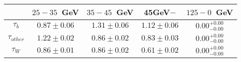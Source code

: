 \centering
\begin{tabular}{|c|c|c|c|c|} \hline
 & $25-35$~GeV & $35-45$~GeV & 45GeV$-$ & $125-0$~GeV\\\hline
$\tau_{b}$ & $0.87\pm0.06$ & $1.31\pm0.06$ & $1.12\pm0.06$ & $0.00^{+0.00}_{-0.00}$\\\hline
$\tau_{other}$ & $1.22\pm0.02$ & $0.86\pm0.02$ & $0.83\pm0.03$ & $0.00^{+0.00}_{-0.00}$\\\hline
$\tau_{W}$ & $0.86\pm0.01$ & $0.86\pm0.02$ & $0.61\pm0.02$ & $0.00^{+0.00}_{-0.00}$\\\hline
\end{tabular}

